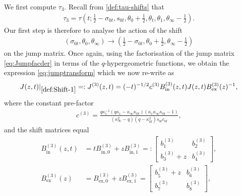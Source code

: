 \documentclass[a4paper,reqno,11pt]{amsart}
\numberwithin{equation}{section}
\numberwithin{figure}{section}
\theoremstyle{plain}
\newtheorem{proposition}[theorem]{Proposition}
\theoremstyle{remark}
\numberwithin{rhp}{section}
\begin{document}
We first compute $\tau_3$. Recall from \eqref{def:tau-shifts} that 
\begin{align}
    \tau_3 =  \tau(t; \frac{1}{2}-\sigma_{0t}, s_{0t}, \theta_0+\frac{1}{2}, \theta_t, \theta_{1}, \theta_{\infty}-\frac{1}{2}).
\end{align}
Our first step is therefore to analyse the action of the shift 
\begin{align}\label{def:Shift-1}
   \left(\sigma_{0t}, \theta_{0}, \theta_{\infty}\right) \to \left(\frac{1}{2}-\sigma_{0t}, \theta_0+\frac{1}{2}, \theta_{\infty}-\frac{1}{2} \right)
\end{align}
on the jump matrix. Once again, using the factorisation of the jump matrix \eqref{eq:Jumpfacder} in terms of the $q$-hypergeometric functions, we obtain the expression \eqref{eq:jumptransform} which we now re-write as
\begin{align}
    J(z,t)\vert_{\eqref{def:Shift-1}}=: J^{(3)}(z,t) = (-t)^{-1/2} c^{(3)}  B^{(3)}_{\text{in}}(z,t) J(z,t) B^{(3)}_{\text{ex}}(z)^{-1}, \label{jump-shift-J1}
\end{align}
where the constant pre-factor
\begin{align}
    c^{(3)} = \frac{q \kappa_1^{-1} \left(q \kappa_1-\kappa_{\infty} \kappa_{0t}\right) \left(\kappa_1 \kappa_{\infty} \kappa_{0t}-1\right)}{\left(\kappa_{\infty}^2-q\right) \left(q-\kappa_{0t}^2\right) s_{0t} c_{0t}},
\end{align}
and the shift matrices equal
\begin{equation}\label{Bin-out-1}
\begin{split}
    B^{(3)}_{\text{in}}(z,t) &= t B^{(3)}_{\text{in}, 0} + z B^{(3)}_{\text{in},1}=: \begin{bmatrix}
       b^{(3)}_1  & b_2^{(3)} \\
        b_3^{(3)}+z & b_4^{(3)} 
    \end{bmatrix},\\
    B^{(3)}_{\text{ex}}(z) &= B^{(3)}_{\text{ex},0} + z B^{(3)}_{\text{ex},1}= \begin{bmatrix}
       b_5^{(3)}+ z  & b_6^{(3)} \\
        b_7^{(3)} & b_8^{(3)} 
    \end{bmatrix},
\end{split}
\end{equation}
\end{document}
